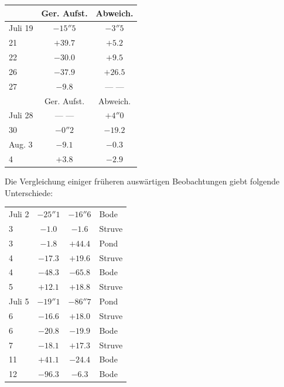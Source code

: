 \begin{center}
\begin{tabular}{l|c|c}
 &  Ger. Aufst.  &  Abweich.  \\
\hline
Juli 19  &  $-15''5$  &  $-3''5$  \\
21  &  $+39.7$  &  $+5.2$  \\
22  &  $-30.0$  &  $+9.5$  \\
26  &  $-37.9$  &  $+26.5$  \\
27  &  $-9.8$  &  --- ---  \\
\hline
  &  Ger. Aufst.  &  Abweich.  \\
\hline
 Juli 28  &  --- ---  &  $+4''0$  \\
 30  &  $-0''2$  &  $-19.2$  \\
 Aug. 3  &  $-9.1$  &  $-0.3$  \\
 4  &  $+3.8$  &  $-2.9$  \\
\end{tabular}
\end{center}

\par\indent Die Vergleichung einiger früheren auswärtigen Beobachtungen giebt folgende Unterschiede:

\begin{center}
\begin{tabular}{l|c|c|l}
Juli 2  &  $-25''1$  &  $-16''6$  &  Bode  \\
3  &  $-1.0$  &  $-1.6$  &  Struve  \\
3  &  $-1.8$  &  $+44.4$  &  Pond  \\
4  &  $-17.3$  &  $+19.6$  &  Struve  \\
4  &  $-48.3$  &  $-65.8$  &  Bode  \\
5  &  $+12.1$  &  $+18.8$  &  Struve  \\
\hline
 Juli 5  &  $-19''1$  &  $-86''7$  &  Pond  \\
 6  &  $-16.6$  &  $+18.0$  &  Struve  \\
 6  &  $-20.8$  &  $-19.9$  &  Bode  \\
 7  &  $-18.1$  &  $+17.3$  &  Struve  \\
 11  &  $+41.1$  &  $-24.4$  &  Bode  \\
 12  &  $-96.3$  &  $-6.3$  &  Bode  \\
\end{tabular}
\end{center}

